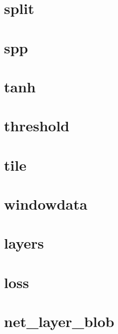 \documentclass[twoside]{book}
\newcommand{\+}{\discretionary{\mbox{\scriptsize$\hookleftarrow$}}{}{}}
\begin{document}
\chapter{split}
\label{md_docs_tutorial_layers_split}

\chapter{spp}
\label{md_docs_tutorial_layers_spp}

\chapter{tanh}
\label{md_docs_tutorial_layers_tanh}

\chapter{threshold}
\label{md_docs_tutorial_layers_threshold}

\chapter{tile}
\label{md_docs_tutorial_layers_tile}

\chapter{windowdata}
\label{md_docs_tutorial_layers_windowdata}

\chapter{layers}
\label{md_docs_tutorial_layers}

\chapter{loss}
\label{md_docs_tutorial_loss}

\chapter{net\+\_\+layer\+\_\+blob}
\label{md_docs_tutorial_net_layer_blob}

\end{document}
